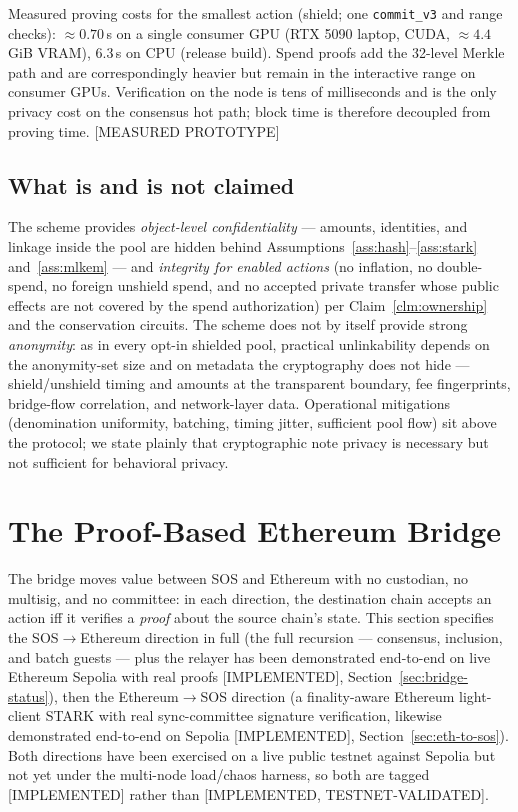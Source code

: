 \documentclass[11pt]{article}
\newcommand{\code}[1]{\texttt{#1}}
\newcommand{\statusI}{\textcolor{statgreen}{\textsf{\scriptsize[IMPLEMENTED]}}}
\newcommand{\statusV}{\textcolor{statgreen}{\textsf{\scriptsize[IMPLEMENTED, TESTNET-VALIDATED]}}}
\newcommand{\statusM}{\textcolor{statblue}{\textsf{\scriptsize[MEASURED PROTOTYPE]}}}
\theoremstyle{plain}
\theoremstyle{definition}
\theoremstyle{remark}
\begin{document}
Measured proving costs for the smallest action (shield; one
\code{commit\_v3} and range checks): $\approx 0.70$\,s on a single consumer
GPU (RTX 5090 laptop, CUDA, $\approx 4.4$\,GiB VRAM), $6.3$\,s on CPU
(release build). Spend proofs add the 32-level Merkle path and are
correspondingly heavier but remain in the interactive range on consumer
GPUs. Verification on the node is tens of milliseconds and is the only
privacy cost on the consensus hot path; block time is therefore decoupled
from proving time. \statusM{}

\subsection{What is and is not claimed}
\label{sec:privacy-limits}

The scheme provides \emph{object-level confidentiality} --- amounts,
identities, and linkage inside the pool are hidden behind
Assumptions~\ref{ass:hash}--\ref{ass:stark} and~\ref{ass:mlkem} --- and
\emph{integrity for enabled actions} (no inflation, no double-spend, no
foreign unshield spend, and no accepted private transfer whose public effects
are not covered by the spend authorization) per Claim~\ref{clm:ownership} and
the conservation circuits. The scheme does not by
itself provide strong \emph{anonymity}: as in every opt-in shielded pool,
practical unlinkability depends on the anonymity-set size and on metadata
the cryptography does not hide --- shield/unshield timing and amounts at the
transparent boundary, fee fingerprints, bridge-flow correlation, and
network-layer data. Operational mitigations (denomination uniformity,
batching, timing jitter, sufficient pool flow) sit above the protocol; we
state plainly that cryptographic note privacy is necessary but not
sufficient for behavioral privacy.

\section{The Proof-Based Ethereum Bridge}
\label{sec:bridge}

The bridge moves value between SOS and Ethereum with no custodian, no
multisig, and no committee: in each direction, the destination chain accepts
an action iff it verifies a \emph{proof} about the source chain's state.
This section specifies the SOS$\to$Ethereum direction in full (the full
recursion --- consensus, inclusion, and batch guests --- plus the relayer has
been demonstrated end-to-end on live Ethereum Sepolia with real proofs
\statusI{}, Section~\ref{sec:bridge-status}), then the Ethereum$\to$SOS
direction (a finality-aware Ethereum light-client STARK with real
sync-committee signature verification, likewise demonstrated end-to-end on
Sepolia \statusI{}, Section~\ref{sec:eth-to-sos}). Both directions have been
exercised on a live public testnet against Sepolia but not yet under the
multi-node load/chaos harness, so both are tagged \statusI{} rather than
\statusV{}.
\end{document}
